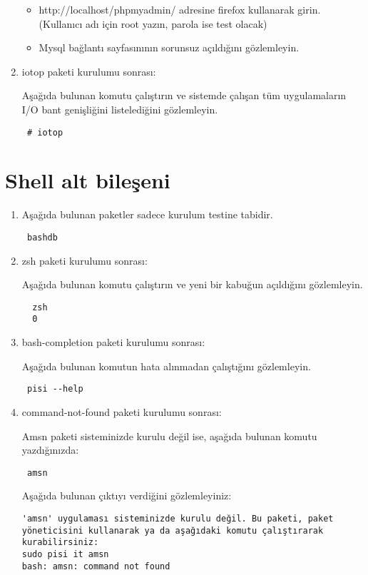 \documentclass[a4paper,10pt]{article}
\begin{document}
\begin{enumerate}
\begin{itemize}
 \item http://localhost/phpmyadmin/ adresine firefox kullanarak girin. (Kullanıcı adı için root yazın, parola ise test olacak)
 \item Mysql bağlantı sayfasınının sorunsuz açıldığını gözlemleyin.
\end{itemize}



 \item iotop paketi kurulumu sonrası:

Aşağıda bulunan komutu çalıştırın ve sistemde çalışan tüm uygulamaların I/O bant genişliğini listelediğini gözlemleyin.
\begin{verbatim}
 # iotop
\end{verbatim}

\end{enumerate}
\section{Shell alt bileşeni}
\begin{enumerate}
\item Aşağıda bulunan paketler sadece kurulum testine tabidir.
\begin{verbatim}
 bashdb
\end{verbatim}

 \item zsh paketi kurulumu sonrası:

Aşağıda bulunan komutu çalıştırın ve yeni bir kabuğun açıldığını gözlemleyin.
 \begin{verbatim}
  zsh
  0
 \end{verbatim}

 \item bash-completion paketi kurulumu sonrası:

Aşağıda bulunan komutun hata alınmadan çalıştığını gözlemleyin.
\begin{verbatim}
 pisi --help
\end{verbatim}

\item command-not-found paketi kurulumu sonrası:

Amsn paketi sisteminizde kurulu değil ise, aşağıda bulunan komutu yazdığınızda:
\begin{verbatim}
 amsn
\end{verbatim}

Aşağıda bulunan çıktıyı verdiğini gözlemleyiniz:
\begin{verbatim}
'amsn' uygulaması sisteminizde kurulu değil. Bu paketi, paket yöneticisini kullanarak ya da aşağıdaki komutu çalıştırarak kurabilirsiniz:
sudo pisi it amsn
bash: amsn: command not found
\end{verbatim}

\end{enumerate}
\end{document}
